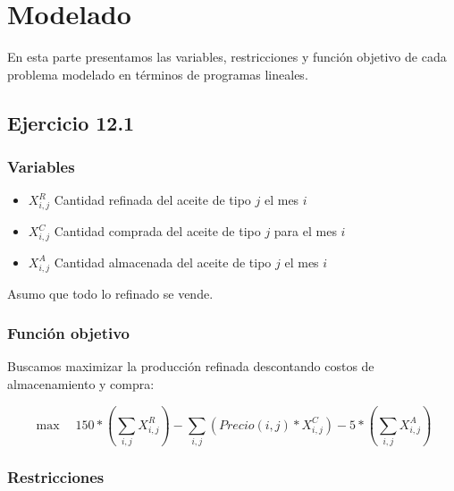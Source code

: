 \section{Modelado}

En esta parte presentamos las variables, restricciones y función objetivo de cada problema modelado en términos de programas lineales.

\subsection{Ejercicio 12.1}
\subsubsection{Variables}

\begin{itemize}
    \item $ X^{R}_{i,j} $ Cantidad refinada del aceite de tipo $j$ el mes $i$

    \item $ X^{C}_{i,j} $ Cantidad comprada del aceite de tipo $j$ para el mes $i$

    \item $ X^{A}_{i,j} $ Cantidad almacenada del aceite de tipo $j$ el mes $i$

\end{itemize}

Asumo que todo lo refinado se vende.

\subsubsection{Función objetivo}

Buscamos maximizar la producción refinada descontando costos de almacenamiento y compra:

$$ \max \quad 150*(\sum_{i,j} X^R_{i,j}) - \sum_{i,j} (Precio(i,j)*X^C_{i,j}) - 5*(\sum_{i,j} X^A_{i,j}) $$

\subsubsection{Restricciones}

